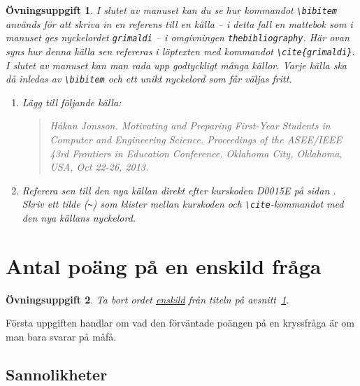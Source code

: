 \documentclass[12pt,a4wide]{article}
\theoremstyle{uppgiftsstil}
\newcommand{\ovningstext}{Övningsuppgift}
\newtheorem{ovning}{\ovningstext}
\newenvironment{uppgift}{\begin{framed}\begin{ovning}}%
                        {\end{ovning}\end{framed}}
\theoremstyle{avklaradstil}
\begin{document}
\begin{uppgift}
  I slutet av manuset kan du se hur kommandot \verb|\bibitem| används
  för  att skriva in en referens till en källa -- i detta fall en
  mattebok som i manuset ges nyckelordet \texttt{grimaldi} -- i
  omgivningen \verb|thebibliography|. Här ovan syns hur denna 
  källa sen refereras i löptexten med kommandot
  \verb|\cite{grimaldi}|. I slutet av manuset kan man rada upp
  godtyckligt många källor. Varje källa ska då inledas av
  \verb|\bibitem| och ett unikt nyckelord som får väljas fritt. 
  \begin{enumerate}
      \item Lägg till följande källa:  
        \begin{quote}
          Håkan Jonsson.  \emph{Motivating and Preparing First-Year Students
            in Computer and Engineering Science}.  Proceedings of the
          ASEE/IEEE 43rd Frontiers in Education Conference.  Oklahoma City,
          Oklahoma, USA, Oct 22-26, 2013.
        \end{quote}
      \item   Referera sen till den nya källan direkt efter kurskoden
        D0015E på sidan
        \pageref{d0010e}.  %
        Skriv ett tilde (\verb|~|) som klister mellan kurskoden och
        \verb|\cite|-kommandot med den nya källans nyckelord. 
  \end{enumerate}
\end{uppgift}

\section{Antal poäng på en enskild fråga} 

\label{sect:question}   
\begin{uppgift}
  Ta bort ordet \underline{enskild} från titeln på
  avsnitt~\ref{sect:question}.  
\end{uppgift}
Första uppgiften handlar om vad den förväntade poängen på en
kryssfråga är om man bara svarar på måfå. 

\subsection{Sannolikheter}       %
\end{document}
